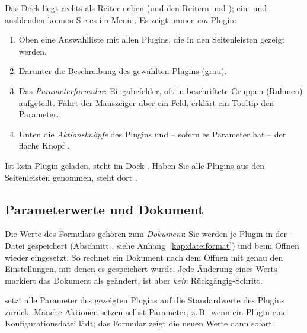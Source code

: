 Das Dock  liegt rechts als Reiter neben  (und den Reitern
 und ); ein- und ausblenden können Sie es im Menü . Es
zeigt immer \emph{ein} Plugin:

\begin{enumerate}
  \item Oben eine Auswahlliste mit allen Plugins, die in den Seitenleisten gezeigt werden.
  \item Darunter die Beschreibung des gewählten Plugins (grau).
  \item Das \emph{Parameterformular}: Eingabefelder, oft in beschriftete Gruppen
        (Rahmen) aufgeteilt. Fährt der Mauszeiger über ein Feld, erklärt ein Tooltip den
        Parameter.
  \item Unten die \emph{Aktionsknöpfe} des Plugins und – sofern es Parameter hat – der flache
        Knopf .
\end{enumerate}


Ist kein Plugin geladen, steht im Dock . Haben Sie
alle Plugins aus den Seitenleisten genommen, steht dort
.

\subsection{Parameterwerte und Dokument}

Die Werte des Formulars gehören zum \emph{Dokument}: Sie werden je Plugin in der
-Datei gespeichert (Abschnitt , siehe
Anhang~\ref{kap:dateiformat}) und beim Öffnen wieder eingesetzt. So rechnet ein Dokument nach
dem Öffnen mit genau den Einstellungen, mit denen es gespeichert wurde. Jede Änderung eines
Werts markiert das Dokument als geändert, ist aber \emph{kein} Rückgängig-Schritt.

 setzt alle Parameter des gezeigten Plugins auf die Standardwerte des
Plugins zurück. Manche Aktionen setzen selbst Parameter, z.\,B.\ wenn ein Plugin eine
Konfigurationsdatei lädt; das Formular zeigt die neuen Werte dann sofort.

